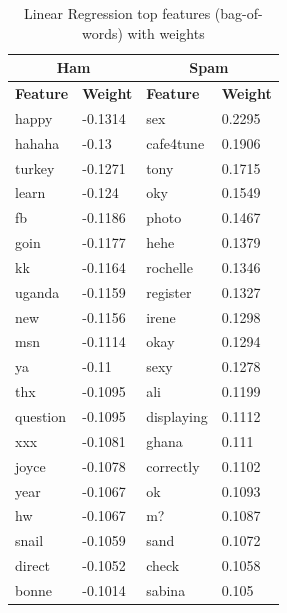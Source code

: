 \documentclass[preprint]{acm_proc_article-sp}
\begin{document}
\begin{table}
\begin{tabular}{l|l||l|l}
\multicolumn{2}{c}{\textbf{Ham}} & 
\multicolumn{2}{c}{\textbf{Spam}} \\
\hline
\textbf{Feature} & \textbf{Weight} & \textbf{Feature} & \textbf{Weight} \\
\hline
happy & -0.1314 & sex & 0.2295\\
hahaha & -0.13 & cafe4tune & 0.1906\\
turkey & -0.1271 & tony & 0.1715\\
learn & -0.124 & oky & 0.1549\\
fb & -0.1186 & photo & 0.1467\\
goin & -0.1177 & hehe & 0.1379\\
kk & -0.1164 & rochelle & 0.1346\\
uganda & -0.1159 & register & 0.1327\\
new & -0.1156 & irene & 0.1298\\
msn & -0.1114 & okay & 0.1294\\
ya & -0.11 & sexy & 0.1278\\
thx & -0.1095 & ali & 0.1199\\
question & -0.1095 & displaying & 0.1112\\
xxx & -0.1081 & ghana & 0.111\\
joyce & -0.1078 & correctly & 0.1102\\
year & -0.1067 & ok & 0.1093\\
hw & -0.1067 & m? & 0.1087\\
snail & -0.1059 & sand & 0.1072\\
direct & -0.1052 & check & 0.1058\\
bonne & -0.1014 & sabina & 0.105\\
\end{tabular}
\caption{Linear Regression top features (bag-of-words) with weights}
\label{tab:lrfeats}
\end{table}
\end{document}
